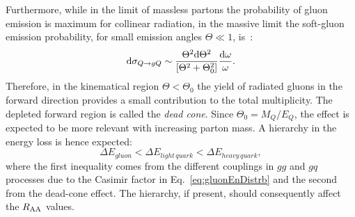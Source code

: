 Furthermore, while in the limit of massless partons the probability of 
gluon emission is maximum for collinear radiation,
in the massive limit the soft-gluon emission probability, for small 
emission angles $\Theta \ll 1$, is~\cite{Dokshitzer:1991fd}:
\begin{equation}
\label{eq:DeadCone}
{\rm d} \sigma_{Q \rightarrow gQ } \sim \frac{\Theta^2 {\rm d} \Theta^2}{[\Theta^2+ \Theta^2_0]} \frac{{\rm d} \omega}{\omega}.
\end{equation}
Therefore, in the kinematical region $\Theta < \Theta_0$ the yield of radiated gluons
in the forward direction provides a small contribution to the total multiplicity. 
The depleted forward region is called the {\it dead cone}.
Since $\Theta_0 = M_Q/E_Q$, the effect is expected to be more 
relevant with increasing parton mass. A hierarchy in 
the energy loss is hence expected:
\begin{equation}
\label{eq:HierachyRaa}
\Delta E_{gluon} < \Delta E_{light\, quark} < \Delta E_{heavy\, quark},
\end{equation}
where the first inequality comes from the different couplings in $gg$ and $gq$ 
processes due to the Casimir factor in Eq.~\ref{eq:gluonEnDistrb} 
and the second from the dead-cone effect. The hierarchy, if present, 
should consequently affect the $R_{\rm AA}$ values.\\


